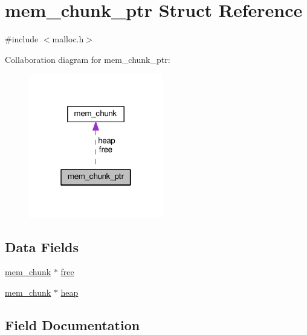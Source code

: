 \hypertarget{structmem__chunk__ptr}{}\section{mem\+\_\+chunk\+\_\+ptr Struct Reference}
\label{structmem__chunk__ptr}


{\ttfamily \#include $<$malloc.\+h$>$}



Collaboration diagram for mem\+\_\+chunk\+\_\+ptr\+:\nopagebreak
\begin{figure}[H]
\begin{center}
\leavevmode
\includegraphics[width=166pt]{structmem__chunk__ptr__coll__graph}
\end{center}
\end{figure}
\subsection*{Data Fields}
\begin{DoxyCompactItemize}
\item 
\hyperlink{structmem__chunk}{mem\+\_\+chunk} $\ast$ \hyperlink{structmem__chunk__ptr_af7a1f60b420bd7ef98dde5a4cbc5bdf3}{free}
\item 
\hyperlink{structmem__chunk}{mem\+\_\+chunk} $\ast$ \hyperlink{structmem__chunk__ptr_aaddfb089e921369846e272d2d2b56e84}{heap}
\end{DoxyCompactItemize}


\subsection{Field Documentation}
\mbox{\label{structmem__chunk__ptr_af7a1f60b420bd7ef98dde5a4cbc5bdf3}} 
